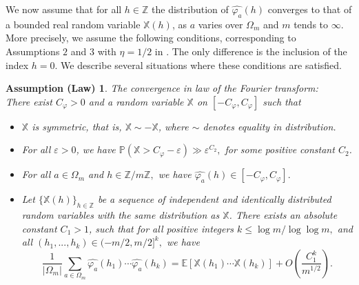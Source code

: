 \documentclass[12pt]{amsart}
\newtheorem*{AssL}{Assumption (Law)}
\theoremstyle{definition}
\numberwithin{equation}{section}
\numberwithin{equation}{section}
\def\E{\mathbb{E}}
\def\P{\mathbb{P}}
\def\Z{\mathbb{Z}}
\def\Mp{C_\varphi}
\def\X{\mathbb{X}}
\def\E{\mathbb{E}}
\begin{document}
We now assume that for all $h \in \Z $ the distribution of $\widehat{\varphi_a}(h)$ converges to that of a bounded real random variable $\X(h)$, as $a$ varies over $ \Omega_m$ and $ m$ tends to $\infty$. More precisely, we assume the following conditions, corresponding to Assumptions $2$ and $3$ with $\eta = 1/2$ in \cite{ABL21}. The only difference is the inclusion of the index $h=0$. We describe several situations where these conditions are satisfied.
\begin{AssL}\label{Ass Law}
    \hypertarget{Ass Law}{The convergence in law of the Fourier transform:}\\ There exist $\Mp>0$ and a random variable $\X$ on $[-\Mp,\Mp]$ such that
\begin{itemize}
    \item $\X$ is symmetric, that is, $\X \sim -\X$, where $\sim$ denotes equality in distribution.

    \item For all $\varepsilon >0$, we have $\P(\X>\Mp-\varepsilon)\gg \varepsilon^{C_2},$ for some positive constant $C_2$.

    \item For all $a\in\Omega_m$ and $h\in \Z /m\Z,$ we have $\widehat{\varphi_a}(h)\in [-\Mp,\Mp].$

    \item Let $\{\X(h)\}_{h\in\Z}$ be a sequence of independent and identically distributed random variables with the same distribution as $\X$. There exists an absolute constant $C_1>1$, such that for all positive integers $k\leq \log m/\log\log m,$ and all $(h_1, ...,h_k)\in (-m/2, m/2]^k,$ we have
\begin{equation}\label{eq moment Ass Law}
\frac{1}{|\Omega_m|}\sum_{a\in\Omega_m} \widehat{\varphi_a}(h_1)\cdots \widehat{\varphi_a}(h_k)
 =
 \E[\X(h_1)\cdots \X(h_k)] +O\left(\frac{C_1^k}{m^{1/2}}\right).
\end{equation}

\end{itemize}
\end{AssL}
\end{document}
